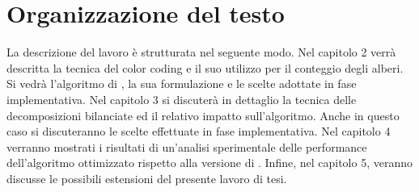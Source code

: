 \section{Organizzazione del testo}

La descrizione del lavoro \`e strutturata nel seguente modo.
Nel capitolo 2 verr\`a descritta la tecnica del color coding e il suo utilizzo per il conteggio degli alberi.
Si vedr\`a l'algoritmo di \cite{bressan2018motif}, la sua formulazione e le scelte adottate in fase implementativa.
Nel capitolo 3 si discuter\`a in dettaglio la tecnica delle decomposizioni bilanciate ed il relativo impatto sull'algoritmo. Anche in questo caso si discuteranno le scelte effettuate in fase implementativa.
Nel capitolo 4 verranno mostrati i risultati di un'analisi sperimentale delle performance dell'algoritmo ottimizzato rispetto alla versione di \cite{bressan2018motif}.
Infine, nel capitolo 5, veranno discusse le possibili estensioni del presente lavoro di tesi.
